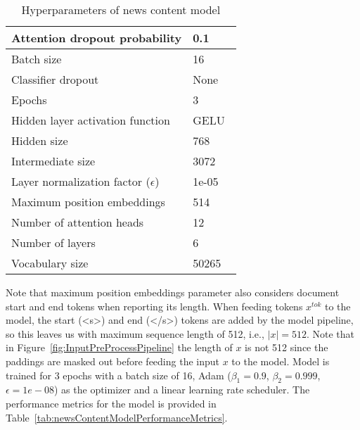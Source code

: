 \begin{table}
    \centering
    \begin{tabular}{|l|l|}
        \hline
        Attention dropout probability           & 0.1                             \\
        \hline
        Batch size                              & 16                              \\
        \hline
        Classifier dropout                      & None                            \\
        \hline
        Epochs                                  & 3                               \\
        \hline
        Hidden layer activation function        & GELU~\parencite{GELU_Hendrycks} \\
        \hline
        Hidden size                             & 768                             \\
        \hline
        Intermediate size                       & 3072                            \\
        \hline
        Layer normalization factor ($\epsilon$) & 1e-05                           \\
        \hline
        Maximum position embeddings             & 514                             \\
        \hline
        Number of attention heads               & 12                              \\
        \hline
        Number of layers                        & 6                               \\
        \hline
        Vocabulary size                         & 50265                           \\
        \hline
    \end{tabular}
    \caption[Parameters of news content model]{Hyperparameters of news content model}
    \label{tab:newsContentModelHyperparameters}
\end{table}
Note that maximum position embeddings parameter also considers document start and end tokens when reporting its length. When feeding tokens $x^{tok}$ to the model, the start (<s>) and end (</s>) tokens are added by the model pipeline, so this leaves us with maximum sequence length of 512, i.e., $|x|=512$. Note that in Figure~\ref{fig:InputPreProcessPipeline} the length of $x$ is not 512 since the paddings are masked out before feeding the input $x$ to the model.   Model is trained for 3 epochs with a batch size of 16, Adam ($\beta_1=0.9$, $\beta_2=0.999$, $\epsilon=1e-08$) as the optimizer and a linear learning rate scheduler. The performance metrics for the model is provided in Table~\ref{tab:newsContentModelPerformanceMetrics}.\\
